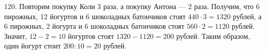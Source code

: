 120. Повторим покупку Коли 3 раза, а покупку Антона --- 2 раза. Получим, что 6 пирожных, 12 йогуртов и 6 шоколадных батончиков стоят $440\cdot3=1320$ рублей, а 6 пирожных, 2 йогурта и 6 шоколадных батончиков стоят $560\cdot2=1120$ рублей. Значит, $12-2=10$ йогуртов стоят $1320-1120=200$ рублей. Таким образом, один йогурт стоит $200:10=20$ рублей.\\
